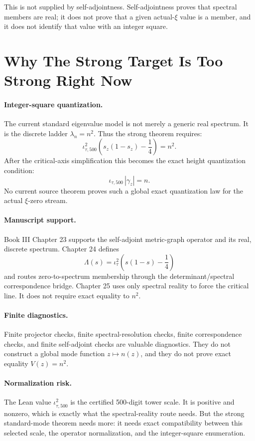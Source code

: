 \documentclass[11pt]{article}
\begin{document}
This is not supplied by self-adjointness.  Self-adjointness proves that spectral
members are real; it does not prove that a given actual-\(\xi\) value is a
member, and it does not identify that value with an integer square.

\section*{Why The Strong Target Is Too Strong Right Now}

\paragraph{Integer-square quantization.}
The current standard eigenvalue model is not merely a generic real spectrum.
It is the discrete ladder \(\lambda_n=n^2\).  Thus the strong theorem requires:
\[
  \iota_{\tau,500}^2
  \left(s_z(1-s_z)-\frac14\right)=n^2.
\]
After the critical-axis simplification this becomes the exact height
quantization condition:
\[
  \iota_{\tau,500}\,|\gamma_z|=n.
\]
No current source theorem proves such a global exact quantization law for the
actual \(\xi\)-zero stream.

\paragraph{Manuscript support.}
Book III Chapter 23 supports the self-adjoint metric-graph operator and its
real, discrete spectrum.  Chapter 24 defines
\[
  \Lambda(s)=\iota_\tau^2\left(s(1-s)-\frac14\right)
\]
and routes zero-to-spectrum membership through the determinant/spectral
correspondence bridge.  Chapter 25 uses only spectral reality to force the
critical line.  It does not require exact equality to \(n^2\).

\paragraph{Finite diagnostics.}
Finite projector checks, finite spectral-resolution checks, finite
correspondence checks, and finite self-adjoint checks are valuable diagnostics.
They do not construct a global mode function \(z\mapsto n(z)\), and they do not
prove exact equality \(V(z)=n^2\).

\paragraph{Normalization risk.}
The Lean value \(\iota_{\tau,500}^2\) is the certified 500-digit tower scale.
It is positive and nonzero, which is exactly what the spectral-reality route
needs.  But the strong standard-mode theorem needs more: it needs exact
compatibility between this selected scale, the operator normalization, and the
integer-square enumeration.
\end{document}
